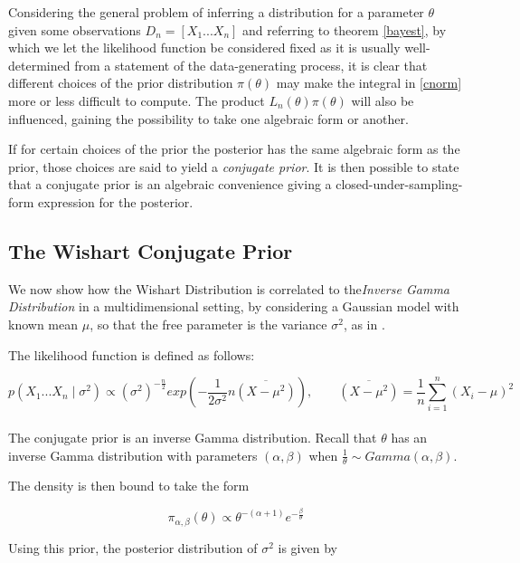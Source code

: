 \documentclass[12pt,openright,twoside,a4paper]{book}
\begin{document}
Considering the general problem of inferring a distribution for a parameter $\theta$ given some observations $D_n=[X_1...X_n]$ and referring to theorem \ref{bayest}, by which we let the likelihood function be considered fixed as it is usually well-determined from a statement of the data-generating process,  it is clear that different choices of the prior distribution $\pi(\theta)$ may make the integral in \ref{cnorm} more or less difficult to compute.
The product $L_n(\theta)\pi(\theta)$ will also be influenced, gaining the possibility to take one algebraic form or another.

If for certain choices of the prior the posterior has the same algebraic form as the prior, those choices are said to yield a \textit{conjugate prior}.
It is then possible to state that a conjugate prior is an algebraic convenience giving a closed-under-sampling-form expression for the posterior.

\subsection{The Wishart Conjugate Prior}

We now show how the Wishart Distribution is correlated to the\textit{Inverse Gamma Distribution} in a multidimensional setting, by  considering a Gaussian model with known mean $\mu$, so that the free parameter is the variance  $\sigma^2$, as in \cite{SML}.

The likelihood function is defined as follows:

\begin{equation}
p(X_1...X_n\mid \sigma^2)\propto (\sigma^2)^{-\frac{n}{2}}exp(-\frac{1}{2\sigma^2}n \overline{(X-\mu^2)}) , \qquad \overline{(X-\mu^2)}=\frac{1}{n}\sum_{i=1}^n(X_i-\mu)^2
\label{gausslike}
\end{equation}
\\[12pt]

The conjugate prior is an inverse Gamma distribution. Recall that $\theta$ has an inverse Gamma distribution with parameters $(\alpha,\beta)$   when $\frac{1}{\theta}\sim Gamma(\alpha,\beta)$.

The density is then bound to take the form 

\begin{equation}
\pi_{\alpha,\beta}(\theta)\propto \theta^{-(\alpha+1)}e^{-\frac{\beta}{\theta}}
\end{equation}

Using this prior, the posterior distribution of $\sigma^2$ is given by
\end{document}
